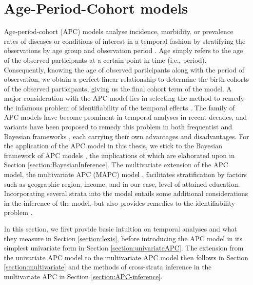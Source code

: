 \section{Age-Period-Cohort models}\label{section:Age-period-cohort-models}
Age-period-cohort (APC) models analyse incidence, morbidity, or prevalence rates of diseases or conditions of interest in a temporal fashion by stratifying the observations by age group and observation period \citep{APC-OLD, APC-OLD-2, APC-OLD-3}. Age simply refers to the age of the observed participants at a certain point in time (i.e., period). Consequently, knowing the age of observed participants along with the period of observation, we obtain a perfect linear relationship to determine the birth cohorts of the observed participants, giving us the final cohort term of the model. A major consideration with the APC model lies in selecting the method to remedy the infamous problem of identifiability of the temporal effects \citep{APC-wakefield}. The family of APC models have become prominent in temporal analyses in recent decades, and variants have been proposed to remedy this problem in both frequentist \citep{Rosenberg2023} and Bayesian frameworks \citep{berzuini1993bayesian,berzuini1994bayesian}, each carrying their own advantages and disadvantages. For the application of the APC model in this thesis, we stick to the Bayesian framework of APC models \citep{APC-Bayesian-Yang,APC-Bayesian-Held}, the implications of which are elaborated upon in Section \ref{section:BayesianInference}. The multivariate extension of the APC model, the multivariate APC (MAPC) model \citep{hansell2003copd, jacobsen2004women}, facilitates stratification by factors such as geographic region, income, and in our case, level of attained education. Incorporating several strata into the model entails some additional considerations in the inference of the model, but also provides remedies to the identifiability problem \citep{APC-Bayesian-Andrea}.

In this section, we first provide basic intuition on temporal analyses and what they measure in Section \ref{section:lexis}, before introducing the APC model in its simplest univariate form in Section \ref{section:univariateAPC}. The extension from the univariate APC model to the multivariate APC model then follows in Section \ref{section:multivariate} and the methods of cross-strata inference in the multivariate APC in Section \ref{section:APC-inference}.

